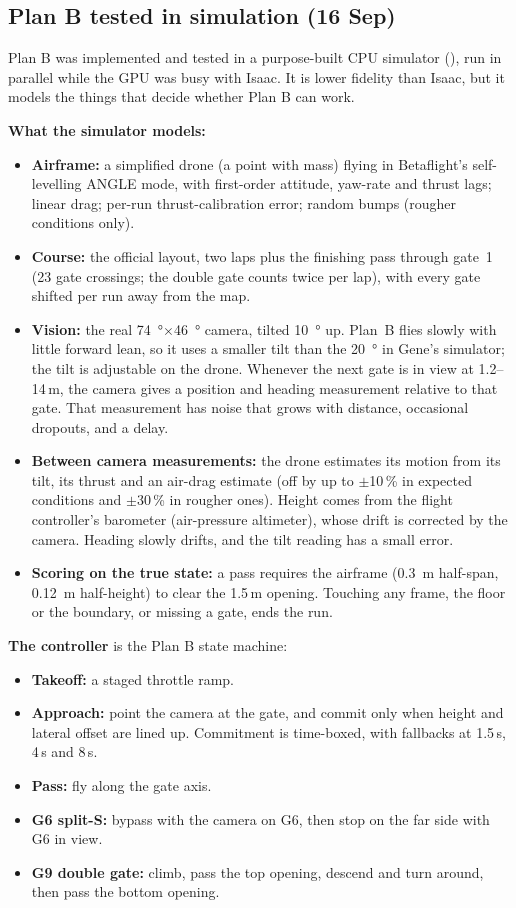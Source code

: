
\subsection{Plan B tested in simulation (16 Sep)}\label{sec:planbsim}
Plan B was implemented and tested in a purpose-built CPU simulator (), run in parallel while the GPU was busy with Isaac. It is lower fidelity than Isaac, but it models the things that decide whether Plan B can work.

\textbf{What the simulator models:}
\begin{itemize}
\item \textbf{Airframe:} a simplified drone (a point with mass) flying in Betaflight's self-levelling ANGLE mode, with first-order attitude, yaw-rate and thrust lags; linear drag; per-run thrust-calibration error; random bumps (rougher conditions only).
\item \textbf{Course:} the official layout, two laps plus the finishing pass through gate~1 (23 gate crossings; the double gate counts twice per lap), with every gate shifted per run away from the map.
\item \textbf{Vision:} the real \SI{74}{\degree}$\times$\SI{46}{\degree} camera, tilted \SI{10}{\degree} up. Plan~B flies slowly with little forward lean, so it uses a smaller tilt than the \SI{20}{\degree} in Gene's simulator; the tilt is adjustable on the drone. Whenever the next gate is in view at 1.2--14\,m, the camera gives a position and heading measurement relative to that gate. That measurement has noise that grows with distance, occasional dropouts, and a delay.
\item \textbf{Between camera measurements:} the drone estimates its motion from its tilt, its thrust and an air-drag estimate (off by up to $\pm$10\,\% in expected conditions and $\pm$30\,\% in rougher ones). Height comes from the flight controller's barometer (air-pressure altimeter), whose drift is corrected by the camera. Heading slowly drifts, and the tilt reading has a small error.
\item \textbf{Scoring on the true state:} a pass requires the airframe (\SI{0.3}{m} half-span, \SI{0.12}{m} half-height) to clear the 1.5\,m opening. Touching any frame, the floor or the boundary, or missing a gate, ends the run.
\end{itemize}

\textbf{The controller} is the Plan B state machine:
\begin{itemize}
\item \textbf{Takeoff:} a staged throttle ramp.
\item \textbf{Approach:} point the camera at the gate, and commit only when height and lateral offset are lined up. Commitment is time-boxed, with fallbacks at 1.5\,s, 4\,s and 8\,s.
\item \textbf{Pass:} fly along the gate axis.
\item \textbf{G6 split-S:} bypass with the camera on G6, then stop on the far side with G6 in view.
\item \textbf{G9 double gate:} climb, pass the top opening, descend and turn around, then pass the bottom opening.
\end{itemize}

